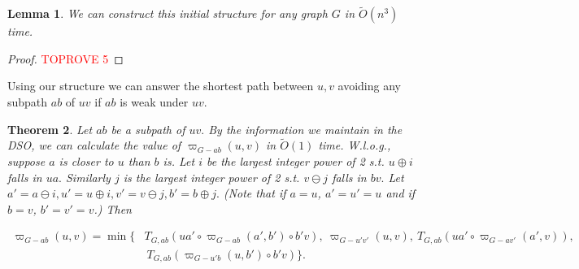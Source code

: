 \documentclass[11pt]{article}
\theoremstyle{plain}
\newtheorem{theorem}{Theorem}[section]
\newtheorem{lemma}[theorem]{Lemma}
\theoremstyle{definition}
\newcommand{\too}[1]{\tilde{O}({#1})}
\newcommand{\odg}[3]{\varpi_{G-#3}\left(#1,#2\right)}
\begin{document}
\begin{lemma}
    We can construct this initial structure for any graph $G$ in $\too{n^3}$ time.
\end{lemma}

\begin{proof}\textcolor{red}{TOPROVE 5}\end{proof}


Using our structure we can answer the shortest path between $u,v$ avoiding any subpath $ab$ of $uv$ if $ab$ is weak under $uv$.


\begin{theorem}\label{thm4-3}
    Let $ab$ be a subpath of $uv.$ By the information we maintain in the DSO, we can calculate the value of $\odg{u}{v}{ab}$ in $\too{1}$ time. W.l.o.g., suppose $a$ is closer to $u$ than $b$ is. Let $i$ be the largest integer power of 2 s.t. $u\oplus i$ falls in $ua.$ Similarly $j$ is the largest integer power of 2 s.t. $v\ominus j$ falls in $bv.$ Let $a'=a\ominus i, u'=u\oplus i, v'=v\ominus j, b'=b\oplus j.$ (Note that if $a=u$, $a'=u'=u$ and if $b=v$, $b'=v'=v$.) Then
    
\begin{equation}\label{eq-1}   
    \begin{aligned}
    \odg{u}{v}{ab}=\min\Big\{&T_{G,ab}\left(ua'\circ \odg{a'}{b'}{ab}\circ b'v\right), ~\odg{u}{v}{u'v'}, ~T_{G,ab}\left(ua'\circ \odg{a'}{v}{av'}\right), \\
    &~T_{G,ab}\left(\odg{u}{b'}{u'b}\circ b'v\right)\Big\}.\\
    \end{aligned}
\end{equation}

\end{theorem}      
\end{document}
